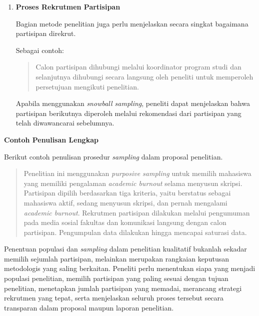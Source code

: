 \documentclass[
  indonesian,
  letterpaper,
  DIV=11,
  numbers=noendperiod]{scrreprt}
\begin{document}
\begin{enumerate}
  Pada penelitian kualitatif, peneliti tidak selalu menetapkan jumlah
  partisipan secara pasti sejak awal. Oleh karena itu, selain
  menyebutkan jumlah partisipan yang direncanakan, peneliti juga perlu
  menjelaskan dasar pertimbangannya.

  \textbf{Contoh:}

  \begin{quote}
  Pengumpulan data dilakukan hingga mencapai saturasi data, yaitu ketika
  wawancara tambahan tidak lagi menghasilkan tema atau informasi baru
  yang relevan dengan tujuan penelitian.
  \end{quote}

  Pernyataan tersebut lebih mencerminkan karakteristik penelitian
  kualitatif dibandingkan hanya menyebutkan target jumlah partisipan.
\item
  \textbf{Proses Rekrutmen Partisipan}

  Bagian metode penelitian juga perlu menjelaskan secara singkat
  bagaimana partisipan direkrut.

  Sebagai contoh:

  \begin{quote}
  Calon partisipan dihubungi melalui koordinator program studi dan
  selanjutnya dihubungi secara langsung oleh peneliti untuk memperoleh
  persetujuan mengikuti penelitian.
  \end{quote}

  Apabila menggunakan \emph{snowball sampling}, peneliti dapat
  menjelaskan bahwa partisipan berikutnya diperoleh melalui rekomendasi
  dari partisipan yang telah diwawancarai sebelumnya.
\end{enumerate}

\textbf{Contoh Penulisan Lengkap}

Berikut contoh penulisan prosedur \emph{sampling} dalam proposal
penelitian.

\begin{quote}
Penelitian ini menggunakan \emph{purposive sampling} untuk memilih
mahasiswa yang memiliki pengalaman \emph{academic burnout} selama
menyusun skripsi. Partisipan dipilih berdasarkan tiga kriteria, yaitu
berstatus sebagai mahasiswa aktif, sedang menyusun skripsi, dan pernah
mengalami \emph{academic burnout}. Rekrutmen partisipan dilakukan
melalui pengumuman pada media sosial fakultas dan komunikasi langsung
dengan calon partisipan. Pengumpulan data dilakukan hingga mencapai
saturasi data.
\end{quote}

Penentuan populasi dan \emph{sampling} dalam penelitian kualitatif
bukanlah sekadar memilih sejumlah partisipan, melainkan merupakan
rangkaian keputusan metodologis yang saling berkaitan. Peneliti perlu
menentukan siapa yang menjadi populasi penelitian, memilih partisipan
yang paling sesuai dengan tujuan penelitian, menetapkan jumlah
partisipan yang memadai, merancang strategi rekrutmen yang tepat, serta
menjelaskan seluruh proses tersebut secara transparan dalam proposal
maupun laporan penelitian.
\end{document}
